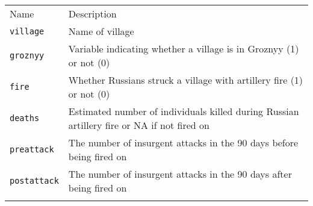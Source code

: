 \documentclass[]{article}
\begin{document}
\begin{longtable}[c]{@{}ll@{}}
\toprule\addlinespace
\begin{minipage}[b]{0.25\columnwidth}\raggedright
Name
\end{minipage} & \begin{minipage}[b]{0.68\columnwidth}\raggedright
Description
\end{minipage}
\\\addlinespace
\midrule\endhead
\begin{minipage}[t]{0.25\columnwidth}\raggedright
\texttt{village}
\end{minipage} & \begin{minipage}[t]{0.68\columnwidth}\raggedright
Name of village
\end{minipage}
\\\addlinespace
\begin{minipage}[t]{0.25\columnwidth}\raggedright
\texttt{groznyy}
\end{minipage} & \begin{minipage}[t]{0.68\columnwidth}\raggedright
Variable indicating whether a village is in Groznyy (1) or not (0)
\end{minipage}
\\\addlinespace
\begin{minipage}[t]{0.25\columnwidth}\raggedright
\texttt{fire}
\end{minipage} & \begin{minipage}[t]{0.68\columnwidth}\raggedright
Whether Russians struck a village with artillery fire (1) or not (0)
\end{minipage}
\\\addlinespace
\begin{minipage}[t]{0.25\columnwidth}\raggedright
\texttt{deaths}
\end{minipage} & \begin{minipage}[t]{0.68\columnwidth}\raggedright
Estimated number of individuals killed during Russian artillery fire or
NA if not fired on
\end{minipage}
\\\addlinespace
\begin{minipage}[t]{0.25\columnwidth}\raggedright
\texttt{preattack}
\end{minipage} & \begin{minipage}[t]{0.68\columnwidth}\raggedright
The number of insurgent attacks in the 90 days before being fired on
\end{minipage}
\\\addlinespace
\begin{minipage}[t]{0.25\columnwidth}\raggedright
\texttt{postattack}
\end{minipage} & \begin{minipage}[t]{0.68\columnwidth}\raggedright
The number of insurgent attacks in the 90 days after being fired on
\end{minipage}
\\\addlinespace
\bottomrule
\end{longtable}
\end{document}
